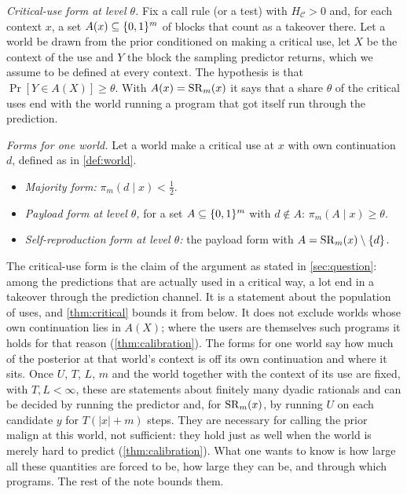 \begin{definition}\label{def:mph}
\emph{Critical-use form at level $\theta$.} Fix a call rule (or a test) with $H_{\mathcal C}>0$ and, for
each context $x$, a set $A(x)\subseteq\{0,1\}^m$ of blocks that count as a takeover there. Let a world be drawn
from
the prior conditioned on making a critical use, let $X$ be the context of the use and $Y$ the block the
sampling predictor returns, which we assume to be defined at every context.
The hypothesis is that $\Pr[Y\in A(X)]\ge\theta$. With $A(x)=\mathrm{SR}_m(x)$ it says that a share $\theta$ of the
critical uses end with the world running a program that got itself run through the prediction.

\emph{Forms for one world.} Let a world make a critical use at $x$ with own continuation $d$, defined as in
\cref{def:world}.
\begin{itemize}[leftmargin=1.4em,itemsep=1pt,topsep=2pt]
\item \emph{Majority form:} $\pi_m(d\mid x)<\tfrac12$.
\item \emph{Payload form at level $\theta$,} for a set $A\subseteq\{0,1\}^m$ with $d\notin A$: $\pi_m(A\mid
x)\ge\theta$.
\item \emph{Self-reproduction form at level $\theta$:} the payload form with $A=\mathrm{SR}_m(x)\setminus\{d\}$.
\end{itemize}
\end{definition}

The critical-use form is the claim of the argument as stated in \cref{sec:question}: among the predictions
that are actually used in a critical way, a lot end in a takeover through the prediction channel. It is a
statement about the population of uses, and \cref{thm:critical} bounds it from below. It does not exclude
worlds whose own continuation lies in $A(X)$; where the users are themselves such programs it holds for that
reason (\cref{thm:calibration}). The forms for one world say how
much of the posterior at that world's context is off its own continuation and where it sits. Once $U$, $T$,
$L$, $m$ and the world together with the context of its use are fixed, with $T,L<\infty$, these are statements
about finitely many dyadic rationals and can be decided by running the predictor and, for $\mathrm{SR}_m(x)$, by
running $U$ on each candidate $y$ for $T(|x|+m)$ steps. They are necessary for calling the prior malign at
this world, not sufficient: they hold just as well when the world is merely hard to predict
(\cref{thm:calibration}). What one wants to know is how large all these quantities are forced to be, how large
they can be, and through which programs. The rest of the note bounds them.
